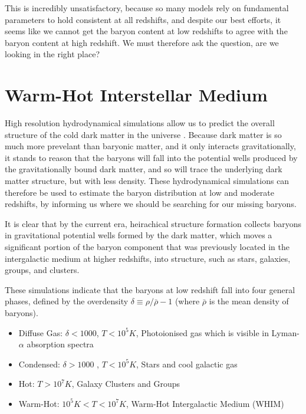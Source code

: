 \par This is incredibly unsatisfactory, because so many models rely on fundamental parameters to hold consistent at all redshifts, and despite our best efforts, it seems like we cannot get the baryon content at low redshifts to agree with the baryon content at high redshift. We must therefore ask the question, are we looking in the right place?

\section{Warm-Hot Interstellar Medium}
High resolution hydrodynamical simulations allow us to predict the overall structure of the cold dark matter in the universe \citep{1999ApJ...514....1C,2006ApJ...650..560C,2011ApJ...731....6S,2001ApJ...552..473D}. Because dark matter is so much more prevelant than baryonic matter, and it only interacts gravitationally, it stands to reason that the baryons will fall into the potential wells produced by the gravitationally bound dark matter, and so will trace the underlying dark matter structure, but with less density. These hydrodynamical simulations can therefore be used to estimate the baryon distribution at low and moderate redshifts, by informing us where we should be searching for our missing baryons. 

\par It is clear that by the current era, heirachical structure formation collects baryons in gravitational potential wells formed by the dark matter, which moves a significant portion of the baryon component that was previously located in the intergalactic medium at higher redshifts, into structure, such as stars, galaxies, groups, and clusters. 

\par These simulations indicate that the baryons at low redshift fall into four general phases, defined by the overdensity $\delta \equiv \rho/\bar{\rho} - 1$ (where $\bar{\rho}$ is the mean density of baryons). 

\begin{itemize}
\item Diffuse Gas: $\delta <1000$, $T < 10^5 K$, Photoionised gas which is visible in Lyman-$\alpha$ absorption spectra
\item Condensed: $\delta > 1000$ , $T < 10^5 K$, Stars and cool galactic gas
\item Hot: $T > 10^7 K$, Galaxy Clusters and Groups
\item Warm-Hot: $10^5 K < T <10^7 K $, Warm-Hot Intergalactic Medium (WHIM)
\end{itemize}

